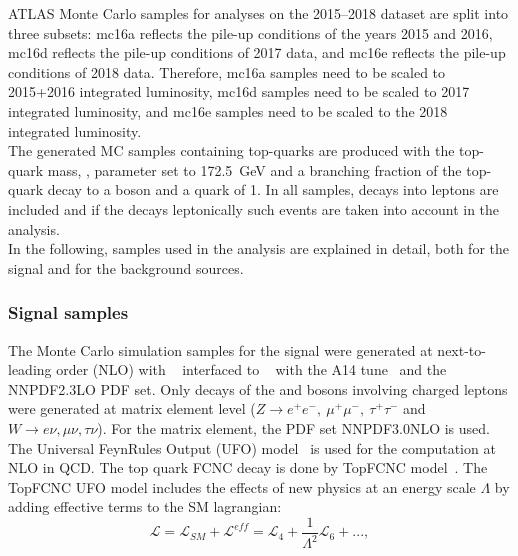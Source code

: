 ATLAS Monte Carlo samples for analyses on the 2015--2018 dataset are split into three subsets: mc16a reflects the pile-up conditions of the years 2015 and 2016, mc16d reflects the pile-up conditions of 2017 data, and mc16e reflects the pile-up conditions of 2018 data. Therefore, mc16a samples need to be scaled to 2015+2016 integrated luminosity, mc16d samples need to be scaled to 2017 integrated luminosity, and mc16e samples need to be scaled to the 2018 integrated luminosity.\\
The generated MC samples containing top-quarks are produced with the top-quark mass, \mtop,
parameter set to \SI{172.5}{\GeV} and a branching fraction of the top-quark decay to a \PW boson and a \Pqb quark of 1. 
In all samples, decays into \Pgt leptons are included and if the \Pgt decays leptonically such events are taken into account in the analysis.\\
In the following, samples used in the analysis are explained in detail, both for the signal and for the background sources.

\subsubsection{Signal samples}
\label{sec:samples:mc:sig}

The Monte Carlo simulation samples for the signal were generated at next-to-leading order (NLO) with \aMCatNLO~\cite{Alwall:2014hca} interfaced to \PythiaEight~\cite{Sjostrand:2007gs} with the \textsc{A14} tune~\cite{Skands:2010ak} and the \textsc{NNPDF2.3LO} PDF set. Only decays of the \PW and \PZ bosons involving charged leptons were generated at matrix element level (\mbox{$Z\to e^+e^-,~\mu^+\mu^-,~\tau^+\tau^-$} and \mbox{$W \to e\nu, \mu\nu, \tau\nu$)}. For the matrix element, the PDF set \textsc{NNPDF3.0NLO} is used. The Universal FeynRules Output (UFO) model~\cite{Alloul:2013bka} is used for the computation at NLO in QCD. The top quark FCNC decay is done by TopFCNC model~\cite{Degrande:2014tta,Durieux:2014xla}.
The TopFCNC UFO model includes the effects of new physics at an energy scale $\Lambda$ by adding effective terms to the SM lagrangian:
\begin{equation}
\mathcal{L} = \mathcal{L}_{SM} + \mathcal{L}^{eff} = \mathcal{L}_4 + \frac{1}{\Lambda^2} \mathcal{L}_6+ ...,
\end{equation}

